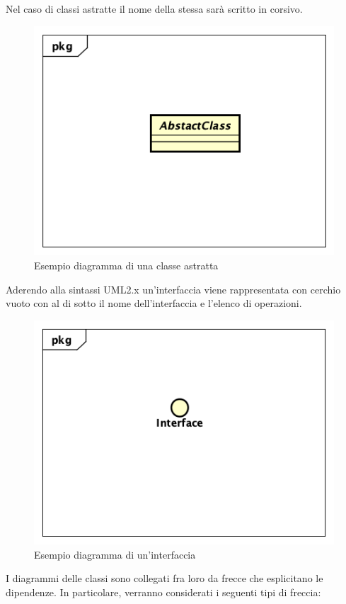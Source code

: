 Nel caso di classi astratte il nome della stessa sarà scritto in corsivo.
\begin{figure}[h]
	\centering
	\includegraphics[scale=0.5]{images/ClasseAstratta.png}
	\caption{Esempio diagramma di una classe astratta}\label{}
\end{figure}
Aderendo alla sintassi UML2.x un'interfaccia viene rappresentata con cerchio vuoto con al di sotto il nome dell'interfaccia e l'elenco di operazioni.
\begin{figure}[h]
	\centering
	\includegraphics[scale=0.5]{images/Interfaccia.png}
	\caption{Esempio diagramma di un'interfaccia}\label{}
\end{figure}
I diagrammi delle classi sono collegati fra loro da frecce che esplicitano le dipendenze. In particolare, verranno considerati i seguenti tipi di freccia:
